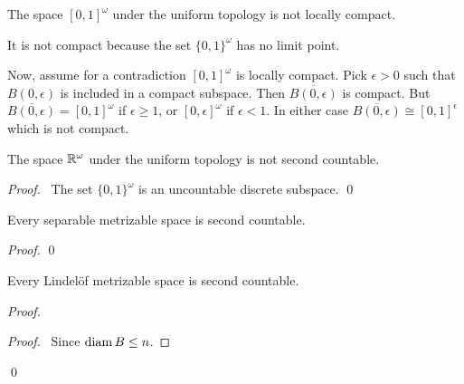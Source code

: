 \begin{example}
    The space $[0,1]^\omega$ under the uniform topology is not locally compact.

    It is not compact because the set $\{ 0,1 \}^\omega$ has no limit point.

    Now, assume for a contradiction $[0,1]^\omega$ is locally compact. Pick $\epsilon > 0$
    such that $B(0,\epsilon)$ is included in a compact subspace. Then $\overline{B(0,\epsilon)}$ is compact.
    But $\overline{B(0,\epsilon)} = [0,1]^\omega$ if $\epsilon \geq 1$, or $[0,\epsilon]^\omega$
    if $\epsilon < 1$. In either case $\overline{B(0,\epsilon)} \cong [0,1]^\epsilon$ which is not
    compact.
\end{example}

\begin{example}
    The space $\mathbb{R}^\omega$ under the uniform topology is not second countable.

    \begin{proof}
        \pf\ The set $\{0,1\}^\omega$ is an uncountable discrete subspace. \qed
    \end{proof}
\end{example}

\begin{proposition}
    Every separable metrizable space is second countable.
\end{proposition}

\begin{proof}
    \pf
    \qed
\end{proof}

\begin{proposition}[AC]
    Every Lindel\"{o}f metrizable space is second countable.
\end{proposition}

\begin{proof}
    \pf
    \begin{proof}
        \pf\ Since $\operatorname{diam} B \leq n$.
    \end{proof}
    \qed
\end{proof}

